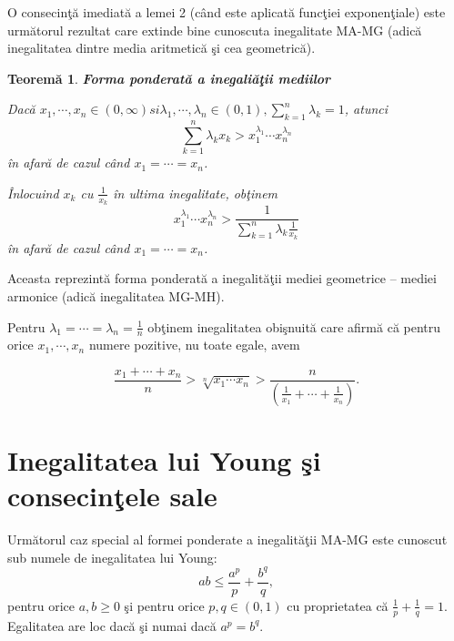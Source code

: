 \documentclass[a4paper,12pt,oneside]{report}
\newtheorem{theorem}{Teorem\u a}
\begin{document}
O consecin\c{t}\u{a} imediat\u{a} a lemei 2 (c\^{a}nd este aplicat\u{a} func\c{t}iei exponen\c{t}iale) este urm\u{a}torul rezultat care extinde bine cunoscuta inegalitate MA-MG (adic\u{a} inegalitatea dintre media aritmetic\u{a} \c{s}i cea geometric\u{a}).


\begin{theorem}
\textbf{Forma ponderat\u{a} a inegali\u{a}\c{t}ii mediilor}

Dac\u{a} \(x_{1},\cdots,x_{n}\in \left ( 0,\infty  \right ) si \lambda_{1},\cdots,\lambda _{n} \in \left ( 0 , 1 \right ), \sum_{k = 1}^{n}\lambda _{k}= 1\), atunci
\begin{displaymath}
  \sum_{k = 1}^{n}\lambda _{k}x_{k}> x_{1}^{\lambda _{1}}\cdots x_{n}^{\lambda _{n}}
\end{displaymath}
\^{i}n afar\u{a} de cazul c\^{a}nd \(x_{1} = \cdots = x_{n}\).
  
  \^{I}nlocuind \(x_{k}\) cu \(\frac{1}{x_{k} }\) \^{i}n ultima inegalitate, ob\c{t}inem
\begin{displaymath}
  x_{1}^{\lambda _{1}}\cdots x_{n}^{\lambda _{n}}> \frac{1}{\sum_{k = 1}^{n}\lambda _{k}\frac{1}{x_{k}}}
\end{displaymath}
\^{i}n afar\u{a} de cazul c\^{a}nd \(x_{1} = \cdots = x_{n}\).
\end{theorem}
Aceasta reprezint\u{a} forma ponderat\u{a} a inegalit\u{a}\c{t}ii mediei geometrice – mediei armonice (adic\u{a} inegalitatea MG-MH).

Pentru \(\lambda _{1} = \cdots =\lambda _{n}= \frac{1}{n}\) ob\c{t}inem inegalitatea obi\c{s}nuit\u{a} care afirm\u{a} c\u{a} pentru orice \(x_{1},\cdots,x_{n}\)  numere pozitive, nu toate egale, avem

\begin{displaymath}
  \frac{x_{1}+\cdots+x_{n}}{n}> \sqrt[n]{x_{1}\cdots x_{n}}> \frac{n}{\left ( \frac{1}{x_{1}}+\cdots+\frac{1}{x_{n}} \right )}.
\end{displaymath}




\section{Inegalitatea lui Young \c{s}i consecin\c{t}ele sale}

Urm\u{a}torul caz special al formei ponderate a inegalit\u{a}\c{t}ii MA-MG este cunoscut sub numele de inegalitatea lui Young:
\begin{displaymath}
  ab \leq \frac{a^{p}}{p}+ \frac{b^{q}}{q}, \label{eq: 1.4} \tag{1.4}
\end{displaymath}
pentru orice \(a,b \geq 0\)
\c{s}i pentru orice  \(p,q \in \left ( 0 , 1 \right )\) cu proprietatea c\u{a} \(\frac{1}{p}+\frac{1}{q} = 1\).
Egalitatea are loc dac\u{a} \c{s}i numai dac\u{a} \(a^{p}= b^{q}\).
\end{document}
